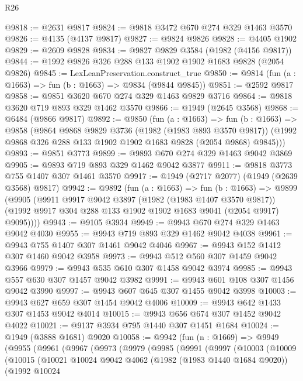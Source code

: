 \begin{lexlean}{R26}
\begin{coremodule}
@9818 := @2631 @9817
@9824 := @9818 @3472 @670 @274 @329 @1463 @3570
@9826 := @4135 (@4137 @9817)
@9827 := @9824 @9826
@9828 := @4405 @1902
@9829 := @2609 @9828
@9834 := @9827 @9829 @3584 (@1982 (@4156 @9817))
@9844 := @1992 @9826 @326 @288 @133 @1902 @1902 @1683 @9828 (@2054 @9826)
@9845 := LexLeanPreservation.construct_true
@9850 := @9814 (fun (a : @1663) => fun (b : @1663) => @9834 (@9844 @9845))
@9851 := @2592 @9817
@9858 := @9851 @3620 @670 @274 @329 @1463 @9829 @3716
@9864 := @9818 @3620 @719 @893 @329 @1462 @3570
@9866 := @1949 (@2645 @3568)
@9868 := @6484 (@9866 @9817)
@9892 := @9850
    (fun (a : @1663) =>
    fun (b : @1663) =>
    @9858
      (@9864
        @9868
        @9829
        @3736
        (@1982 (@1983 @893 @3570 @9817))
        (@1992 @9868 @326 @288 @133 @1902 @1902 @1683 @9828 (@2054 @9868) @9845)))
@9893 := @9851 @3773
@9899 := @9893 @670 @274 @329 @1463 @9042 @3869
@9905 := @9893 @719 @893 @329 @1462 @9042 @3877
@9911 := @9818 @3773 @755 @1407 @307 @1461 @3570
@9917 := @1949 (@2717 @2077) (@1949 (@2639 @3568) @9817)
@9942 := @9892
    (fun (a : @1663) =>
    fun (b : @1663) =>
    @9899
      (@9905
        (@9911
          @9917
          @9042
          @3897
          (@1982 (@1983 @1407 @3570 @9817))
          (@1992 @9917 @304 @288 @133 @1902 @1902 @1683 @9041 (@2054 @9917) @9095))))
@9943 := @9105 @3934
@9949 := @9943 @670 @274 @329 @1463 @9042 @4030
@9955 := @9943 @719 @893 @329 @1462 @9042 @4038
@9961 := @9943 @755 @1407 @307 @1461 @9042 @4046
@9967 := @9943 @152 @1412 @307 @1460 @9042 @3958
@9973 := @9943 @512 @560 @307 @1459 @9042 @3966
@9979 := @9943 @535 @610 @307 @1458 @9042 @3974
@9985 := @9943 @557 @630 @307 @1457 @9042 @3982
@9991 := @9943 @601 @108 @307 @1456 @9042 @3990
@9997 := @9943 @607 @645 @307 @1455 @9042 @3998
@10003 := @9943 @627 @659 @307 @1454 @9042 @4006
@10009 := @9943 @642 @1433 @307 @1453 @9042 @4014
@10015 := @9943 @656 @674 @307 @1452 @9042 @4022
@10021 := @9137 @3934 @795 @1440 @307 @1451 @1684
@10024 := @1949 (@3888 @1681) @9020
@10058 := @9942
    (fun (n : @1669) =>
    @9949
      (@9955
        (@9961
          (@9967
            (@9973
              (@9979
                (@9985
                  (@9991
                    (@9997
                      (@10003
                        (@10009
                          (@10015
                            (@10021
                              @10024
                              @9042
                              @4062
                              (@1982 (@1983 @1440 @1684 @9020))
                              (@1992
                                @10024

\end{coremodule}
\end{lexlean}
